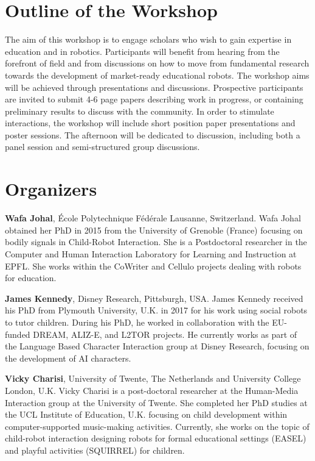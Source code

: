 \documentclass{sig-alternate-05-2015}
\begin{document}
\section{Outline of the Workshop}
The aim of this workshop is to engage scholars who wish to gain expertise in 
education and in robotics. Participants will benefit from hearing from the 
forefront of field and from discussions on how to move from fundamental research 
towards the development of market-ready educational robots.
%
The workshop aims will be achieved through presentations and discussions. 
Prospective participants are invited to submit 4-6 page papers describing work in progress, or containing preliminary results to discuss with the community.
In order to stimulate interactions, the workshop will include short position paper presentations and poster sessions. 
The afternoon will be dedicated to discussion, including both a panel session and semi-structured group discussions.


\section*{Organizers}
\textbf{Wafa Johal}, École Polytechnique Fédérale Lausanne, Switzerland. Wafa Johal obtained her PhD in 2015 from the University of Grenoble (France) focusing on bodily signals in Child-Robot Interaction. She is a Postdoctoral researcher in the Computer and Human Interaction Laboratory for Learning and Instruction  at EPFL. She works within the CoWriter and Cellulo projects dealing with robots for education. 

\textbf{James Kennedy}, Disney Research, Pittsburgh, USA. James Kennedy received his PhD from Plymouth University, U.K. in 2017 for his work using social robots to tutor children. During his PhD, he worked in collaboration with the EU-funded DREAM, ALIZ-E, and L2TOR projects. He currently works as part of the Language Based Character Interaction group at Disney Research, focusing on the development of AI characters.

\textbf{Vicky Charisi}, University of Twente, The Netherlands and University College London, U.K. Vicky Charisi is a post-doctoral researcher at the Human-Media Interaction group at the University of Twente. She completed her PhD studies at the UCL Institute of Education, U.K. focusing on child development within computer-supported music-making activities. Currently, she works on the topic of child-robot interaction designing robots for formal educational settings (EASEL) and playful activities (SQUIRREL) for children.
\end{document}

